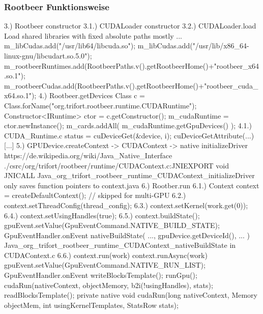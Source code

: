 \begin{frame}
    \frametitle{Rootbeer Funktionsweise}
    3.) Rootbeer constructor
    3.1.) CUDALoader constructor
    3.2.) CUDALoader.load
          Load shared libraries with fixed absolute paths mostly ...
              m_libCudas.add("/usr/lib64/libcuda.so");
              m_libCudas.add("/usr/lib/x86_64-linux-gnu/libcudart.so.5.0");
              m_rootbeerRuntimes.add(RootbeerPaths.v().getRootbeerHome()+"rootbeer_x64.so.1");
              m_rootbeerCudas.add(RootbeerPaths.v().getRootbeerHome()+"rootbeer_cuda_x64.so.1");
    4.) Rootbeer.getDevices
          Class c = Class.forName("org.trifort.rootbeer.runtime.CUDARuntime");
          Constructor<IRuntime> ctor = c.getConstructor();
          m_cudaRuntime = ctor.newInstance();
          m_cards.addAll( m_cudaRuntime.getGpuDevices() );
    4.1.) CUDA_Runtime.c
            status = cuDeviceGet(&device, i);
            cuDeviceGetAttribute(...)
            [...]
    5.) GPUDevice.createContext -> CUDAContext -> native initializeDriver
            https://de.wikipedia.org/wiki/Java_Native_Interface
        ./csrc/org/trifort/rootbeer/runtime/CUDAContext.c:JNIEXPORT void JNICALL Java_org_trifort_rootbeer_runtime_CUDAContext_initializeDriver
            only saves function pointers to context.java
    6.) Rootber.run
    6.1.) Context context = createDefaultContext(); // skipped for multi-GPU
    6.2.) context.setThreadConfig(thread_config);
    6.3.) context.setKernel(work.get(0));
    6.4.) context.setUsingHandles(true);
    6.5.) context.buildState();
            gpuEvent.setValue(GpuEventCommand.NATIVE_BUILD_STATE);
                GpuEventHandler.onEvent
                    nativeBuildState( ..., gpuDevice.getDeviceId(), ... )
                        Java_org_trifort_rootbeer_runtime_CUDAContext_nativeBuildState in CUDAContext.c
    6.6.) context.run(work)
            context.runAsync(work)
                gpuEvent.setValue(GpuEventCommand.NATIVE_RUN_LIST);
                    GpuEventHandler.onEvent
                        writeBlocksTemplate();
                        runGpu();
                            cudaRun(nativeContext, objectMemory, b2i(!usingHandles), stats);
                        readBlocksTemplate();
          private native void cudaRun(long nativeContext, Memory objectMem, int usingKernelTemplates, StatsRow stats);


\end{frame}
